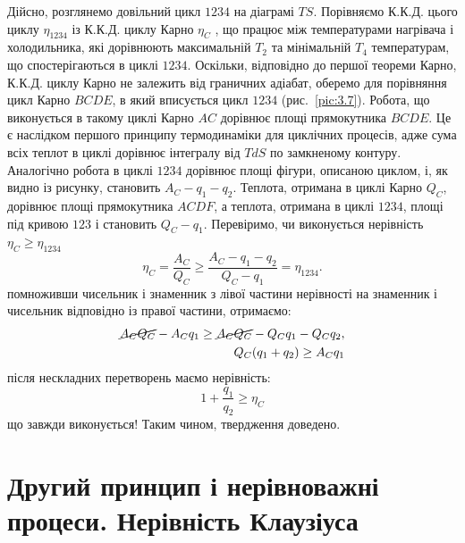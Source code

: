Дійсно, розглянемо довільний цикл $1234$ на діаграмі $TS$. Порівняємо К.К.Д. цього циклу
$\eta_{1234}$ із К.К.Д. циклу Карно $\eta_C$ , що працює між температурами нагрівача і холодильника,
які дорівнюють максимальній $T_2$ та мінімальній $T_4$  температурам, що спостерігаються в циклі
$1234$. Оскільки, відповідно до першої теореми Карно, К.К.Д. циклу Карно не залежить від граничних
адіабат, оберемо для порівняння цикл Карно $BCDE$, в який вписується цикл $1234$ (рис.~\ref{pic:3.7}).
Робота, що виконується в такому циклі Карно $AC$ дорівнює площі прямокутника $BCDE$. Це є наслідком
першого принципу термодинаміки для циклічних процесів, адже сума всіх теплот в циклі дорівнює
інтегралу від $TdS$ по замкненому контуру. Аналогічно робота в циклі $1234$ дорівнює площі фігури,
описаною циклом, і, як видно із рисунку, становить  $A_C-q_1-q_2$. Теплота, отримана в циклі Карно
$Q_C$, дорівнює площі прямокутника $ACDF$, а теплота, отримана в циклі $1234$, площі під кривою $123$ і
становить $Q_C-q_1$. Перевіримо, чи виконується нерівність $ \eta_C \ge \eta_{1234}$
\begin{equation}\label{3.38}
	\eta_C = \frac{A_C}{Q_C} \ge \frac{A_C - q_1 - q_2}{Q_C - q_1} = \eta_{1234}.
\end{equation}
помноживши чисельник і знаменник з лівої частини нерівності на знаменник і чисельник відповідно із
правої частини, отримаємо:
\begin{align}
    \cancel{A_CQ_C} - A_Cq_1 \ge \cancel{A_CQ_C} - Q_Cq_1 - Q_Cq_2, \\
    Q_C(q_1 + q_2) \ge A_Cq_1
\end{align}
після нескладних перетворень маємо нерівність:
\begin{equation}
1+ \frac{q_1}{q_2} \ge \eta_C
\end{equation}
що завжди виконується! Таким чином, твердження доведено.





\section[Другий принцип і нерівноважні процеси. Нерівність Клаузіуса]{Другий принцип і нерівноважні
процеси. Нерівність Клаузіуса}

